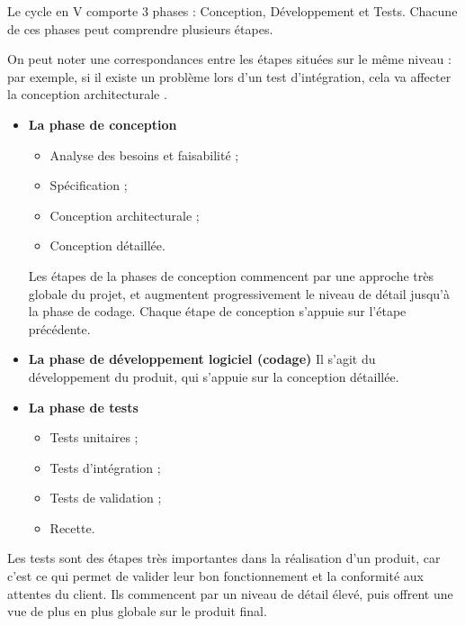 Le cycle en V comporte 3 phases : Conception, Développement et Tests. Chacune de ces phases peut comprendre plusieurs étapes.

On peut noter une correspondances entre les étapes situées sur le même niveau : par exemple, si il existe un problème lors d'un test d'intégration, cela va affecter la conception architecturale . \\


\begin{itemize}
\item \textbf{La phase de conception}

\begin{itemize}
\item Analyse des besoins et faisabilité ;
\item Spécification ;
\item Conception architecturale ;
\item Conception détaillée.
\end{itemize}

Les étapes de la phases de conception commencent par une approche très globale du projet, et augmentent progressivement le niveau de détail jusqu'à la phase de codage. Chaque étape de conception s'appuie sur l'étape précédente. \\

\item \textbf{La phase de développement logiciel (codage)}
Il s'agit du développement du produit, qui s'appuie sur la conception détaillée. \\

\item \textbf{La phase de tests}

\begin{itemize}
\item Tests unitaires ;
\item Tests d'intégration ;
\item Tests de validation ;
\item Recette.
\end{itemize}

\end{itemize}

Les tests sont des étapes très importantes dans la réalisation d'un produit, car c'est ce qui permet de valider leur bon fonctionnement et la conformité aux attentes du client. Ils commencent par un niveau de détail élevé, puis offrent une vue de plus en plus globale sur le produit final.

